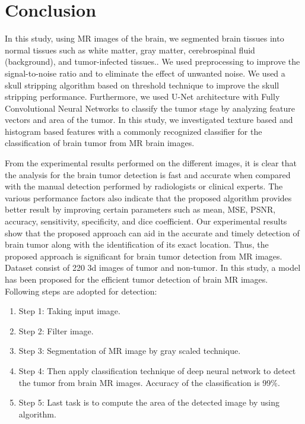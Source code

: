 
\chapter{Conclusion} %

\label{Chapter6} %


  
  In this study, using MR images of the brain, we segmented brain tissues into normal tissues such as white matter, gray matter, cerebrospinal fluid (background), and tumor-infected tissues.. We used preprocessing to improve the signal-to-noise ratio and to eliminate the effect of unwanted noise. We used a skull stripping algorithm based on threshold technique to improve the skull stripping performance. Furthermore, we used U-Net architecture with Fully Convolutional Neural Networks to classify the tumor stage by analyzing feature vectors and area of the tumor. In this study, we investigated texture based and histogram based features with a commonly recognized classifier for the classification of brain tumor from MR brain images.
  
  From the experimental results performed on the different images, it is clear that the analysis for the brain tumor detection is fast and accurate when compared with the manual detection performed by radiologists or clinical experts. The various performance factors also indicate that the proposed algorithm provides better result by improving certain parameters such as mean, MSE, PSNR, accuracy, sensitivity, specificity, and dice coefficient. Our experimental results show that the proposed approach can aid in the accurate and timely detection of brain tumor along with the identification of its exact location. Thus, the proposed approach is significant for brain tumor detection from MR images.
    Dataset consist of 220 3d images of tumor and non-tumor.
    In this study, a model has been proposed for the efficient tumor detection of brain MR images. Following steps are adopted for detection:
    \begin{enumerate}
        \item Step 1: Taking input image.
        \item Step 2: Filter image.
        \item Step 3: Segmentation of MR image by gray scaled technique.
        \item Step 4: Then apply classification technique of deep neural network to detect the tumor from brain MR images. Accuracy of the classification is 99\%.
        \item Step 5: Last task is to compute the area of the detected image by using algorithm.
    \end{enumerate}
    
    
    
   
    